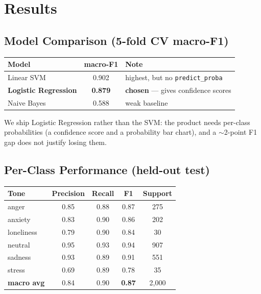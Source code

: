 \documentclass[11pt,a4paper]{article}
\begin{document}
\section{Results}
\subsection{Model Comparison (5-fold CV macro-F1)}
\begin{center}
\begin{tabular}{@{}lcl@{}}
\toprule
\textbf{Model} & \textbf{macro-F1} & \textbf{Note} \\
\midrule
Linear SVM & 0.902 & highest, but no \texttt{predict\_proba} \\
\textbf{Logistic Regression} & \textbf{0.879} & \textbf{chosen} --- gives confidence scores \\
Naive Bayes & 0.588 & weak baseline \\
\bottomrule
\end{tabular}
\end{center}

\noindent We ship Logistic Regression rather than the SVM: the product needs
per-class probabilities (a confidence score and a probability bar chart), and a
$\sim$2-point F1 gap does not justify losing them.

\subsection{Per-Class Performance (held-out test)}
\begin{center}
\begin{tabular}{@{}lcccc@{}}
\toprule
\textbf{Tone} & \textbf{Precision} & \textbf{Recall} & \textbf{F1} & \textbf{Support} \\
\midrule
anger      & 0.85 & 0.88 & 0.87 & 275 \\
anxiety    & 0.83 & 0.90 & 0.86 & 202 \\
loneliness & 0.79 & 0.90 & 0.84 & 30 \\
neutral    & 0.95 & 0.93 & 0.94 & 907 \\
sadness    & 0.93 & 0.89 & 0.91 & 551 \\
stress     & 0.69 & 0.89 & 0.78 & 35 \\
\midrule
\textbf{macro avg} & 0.84 & 0.90 & \textbf{0.87} & 2{,}000 \\
\bottomrule
\end{tabular}
\end{center}
\end{document}
